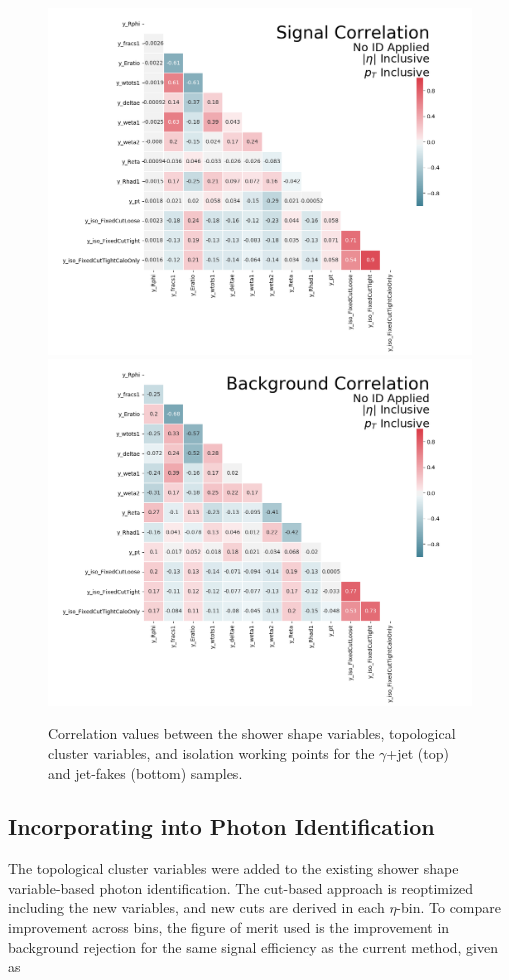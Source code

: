 \begin{figure}[!hp]
    \centering
    \includegraphics[width=.77\textwidth]{chapters/chapter4_photonID/images/sig_none_corr.png}
    \includegraphics[width=.77\textwidth]{chapters/chapter4_photonID/images/bkg_none_corr.png}
    \caption[Correlation values between the shower shape variables, topological cluster variables, and isolation working points for the $\gamma$+jet and jet-fakes sample] {Correlation values between the shower shape variables, topological cluster variables, and isolation working points for the $\gamma$+jet (top) and jet-fakes (bottom) samples.}
    \label{fig:photonid-corrs}
\end{figure}

\subsection{Incorporating into Photon Identification}

The topological cluster variables were added to the existing shower shape variable-based photon identification. The cut-based approach is reoptimized including the new variables, and new cuts are derived in each $\eta$-\pt bin. To compare improvement across bins, the figure of merit used is the improvement in background rejection for the same signal efficiency as the current method, given as

